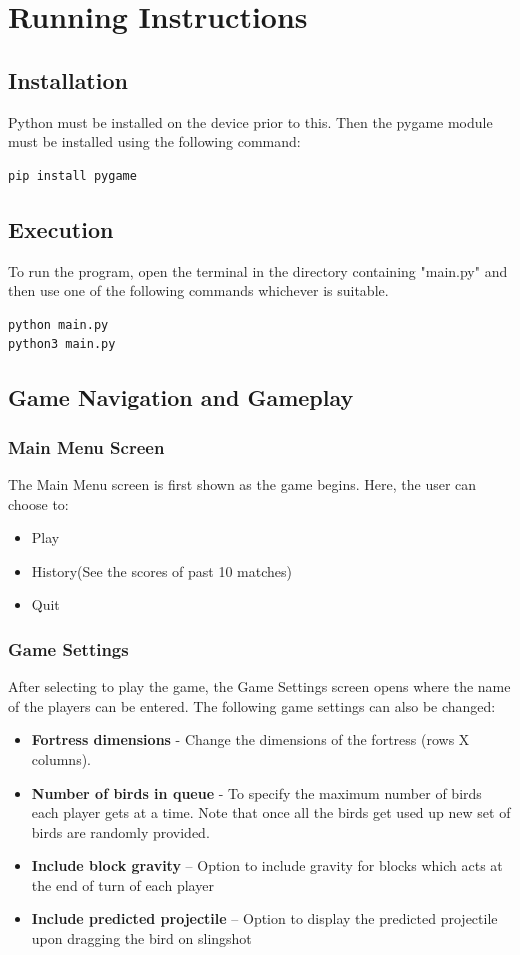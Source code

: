 \documentclass[12pt]{article}
\begin{document}
\section{Running Instructions}
\subsection{Installation}
Python must be installed on the device prior to this. Then the pygame module must be installed using the following command:
\begin{verbatim}
pip install pygame
\end{verbatim}

\subsection{Execution}
To run the program, open the terminal in the directory containing "main.py" and then use one of the following commands whichever is suitable.
\begin{verbatim}
python main.py
python3 main.py
\end{verbatim}

\subsection{Game Navigation and Gameplay}
\subsubsection{Main Menu Screen}
The Main Menu screen is first shown as the game begins. Here, the user can choose to:
\begin{itemize}
    \item Play
    \item History(See the scores of past 10 matches)
    \item Quit
\end{itemize}
\subsubsection{Game Settings}
After selecting to play the game, the Game Settings screen opens where the name of the players can be entered. The following game settings can also be changed:
\begin{itemize}
     \item \textbf{Fortress dimensions} - Change the dimensions of the fortress (rows X columns).
    \item \textbf{Number of birds in queue} - To specify the maximum number of birds each player gets at a time. Note that once all the birds get used up new set of birds are randomly provided.
    \item \textbf{Include block gravity} – Option to include gravity for blocks which acts at the end of turn of each player
    \item \textbf{Include predicted projectile} – Option to display the predicted projectile upon dragging the bird on slingshot
\end{itemize}
\end{document}
